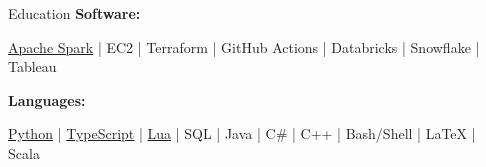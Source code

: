 \documentclass{resume/resume}
\begin{document}
\begin{rSection}{Education}
%
%
%
\vspace{-3pt}
{\bf Software:}
\vspace{-1.83em}
\begin{adjustwidth}{6em}{0pt}
  \href{https://databricks.com/blog/2022/07/14/using-spark-structured-streaming-to-scale-your-analytics.html}{Apache Spark} | 
  EC2 | 
  Terraform |
  GitHub Actions |
  Databricks | 
  Snowflake | 
  Tableau

\end{adjustwidth}

\end{rSection}

%
%   
%
%
%
\vspace{-0.4em}
{\bf Languages:}
\vspace{-1.83em}
\begin{adjustwidth}{6em}{0pt}
  \href{https://github.com/search?q=user\%3ASpelkington+user\%3AUtahTriangle+extension\%3Apy+extension\%3Aipynb&type=Code&ref=advsearch&l=&l=}{Python} |
  \href{https://github.com/search?p=1&q=user\%3ASpelkington+extension\%3Ats+extension\%3Atsx&type=Code}{TypeScript} | 
  \href{https://github.com/search?q=user\%3ASpelkington+extension\%3Alua&type=Code}{Lua} | 
  SQL |
  Java |
  C\# |
  C++ |
  Bash/Shell |
  LaTeX |
  Scala
\end{adjustwidth}
\end{document}
